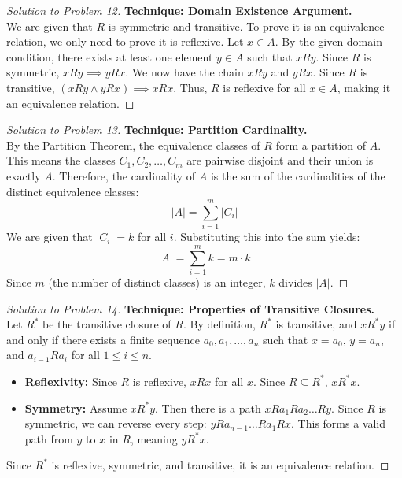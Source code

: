 \documentclass[11pt, a4paper]{article}
\theoremstyle{definition}
\theoremstyle{remark}
\begin{document}
\begin{proof}[Solution to Problem 12]
    \textbf{Technique: Domain Existence Argument.} \\
    We are given that $R$ is symmetric and transitive. To prove it is an equivalence relation, we only need to prove it is reflexive. Let $x \in A$. By the given domain condition, there exists at least one element $y \in A$ such that $xRy$. Since $R$ is symmetric, $xRy \implies yRx$. We now have the chain $xRy$ and $yRx$. Since $R$ is transitive, $(xRy \land yRx) \implies xRx$. Thus, $R$ is reflexive for all $x \in A$, making it an equivalence relation.
\end{proof}

\begin{proof}[Solution to Problem 13]
    \textbf{Technique: Partition Cardinality.} \\
    By the Partition Theorem, the equivalence classes of $R$ form a partition of $A$. This means the classes $C_1, C_2, \dots, C_m$ are pairwise disjoint and their union is exactly $A$. Therefore, the cardinality of $A$ is the sum of the cardinalities of the distinct equivalence classes:
    \[ |A| = \sum_{i=1}^{m} |C_i| \]
    We are given that $|C_i| = k$ for all $i$. Substituting this into the sum yields:
    \[ |A| = \sum_{i=1}^{m} k = m \cdot k \]
    Since $m$ (the number of distinct classes) is an integer, $k$ divides $|A|$.
\end{proof}

\begin{proof}[Solution to Problem 14]
    \textbf{Technique: Properties of Transitive Closures.} \\
    Let $R^*$ be the transitive closure of $R$. By definition, $R^*$ is transitive, and $x R^* y$ if and only if there exists a finite sequence $a_0, a_1, \dots, a_n$ such that $x = a_0$, $y = a_n$, and $a_{i-1} R a_i$ for all $1 \le i \le n$.
    \begin{itemize}
        \item \textbf{Reflexivity:} Since $R$ is reflexive, $xRx$ for all $x$. Since $R \subseteq R^*$, $x R^* x$.
        \item \textbf{Symmetry:} Assume $x R^* y$. Then there is a path $x R a_1 R a_2 \dots R y$. Since $R$ is symmetric, we can reverse every step: $y R a_{n-1} \dots R a_1 R x$. This forms a valid path from $y$ to $x$ in $R$, meaning $y R^* x$.
    \end{itemize}
    Since $R^*$ is reflexive, symmetric, and transitive, it is an equivalence relation.
\end{proof}
\end{document}
